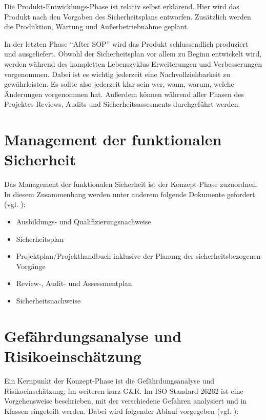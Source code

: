 \documentclass[a4paper,DIV=calc,ngerman]{scrartcl}
\begin{document}
Die Produkt-Entwicklungs-Phase ist relativ selbst erklärend. Hier wird das Produkt nach den Vorgaben des Sicherheitsplans entworfen. Zusätzlich werden die Produktion, Wartung und Außerbetriebnahme geplant.

In der letzten Phase "`After SOP"' wird das Produkt schlussendlich produziert und ausgeliefert. Obwohl der Sicherheitsplan vor allem zu Beginn entwickelt wird, werden während des kompletten Lebenszyklus Erweiterungen und Verbesserungen vorgenommen. Dabei ist es wichtig jederzeit eine Nachvollziehbarkeit zu gewährleisten. Es sollte also jederzeit klar sein wer, wann, warum, welche Änderungen vorgenommen hat. Außerdem können während aller Phasen des Projektes Reviews, Audits und Sicherheitsassesments durchgeführt werden. \cite[S. 121]{1}





\section{Management der funktionalen Sicherheit}
\label{sec:Management}
Das Management der funktionalen Sicherheit ist der Konzept-Phase zuzuordnen. In diesem Zusammenhang werden unter anderem folgende Dokumente gefordert (vgl. \cite[S. 121]{1}):

\begin{itemize}
    \item Ausbildungs- und Qualifizierungsnachweise
    \item Sicherheitsplan
    \item Projektplan/Projekthandbuch inklusive der Planung der sicherheitsbezogenen Vorgänge
    \item Review-, Audit- und Assessmentplan
    \item Sicherheitsnachweise
\end{itemize}





\section{Gefährdungsanalyse und Risikoeinschätzung}
\label{sec:GundR}
Ein Kernpunkt der Konzept-Phase ist die Gefährdungsanalyse und Risikoeinschätzung, im weiteren kurz G\&R. Im ISO Standard 26262 ist eine Vorgehensweise beschrieben, mit der verschiedene Gefahren analysiert und in Klassen eingeteilt werden. Dabei wird folgender Ablauf vorgegeben (vgl. \cite[S. 123]{1}):
\end{document}
